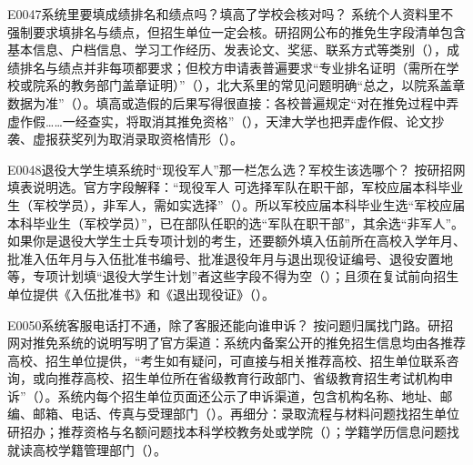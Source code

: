 \begin{qa}{E0047}{系统里要填成绩排名和绩点吗？填高了学校会核对吗？}
系统个人资料里不强制要求填排名与绩点，但招生单位一定会核。研招网公布的推免生字段清单包含基本信息、户档信息、学习工作经历、发表论文、奖惩、联系方式等类别（），成绩排名与绩点并非每项都要求；但校方申请表普遍要求“专业排名证明（需所在学校或院系的教务部门盖章证明）”（），北大系里的常见问题明确“总之，以院系盖章数据为准”（）。填高或造假的后果写得很直接：各校普遍规定“对在推免过程中弄虚作假……一经查实，将取消其推免资格”（），天津大学也把弄虚作假、论文抄袭、虚报获奖列为取消录取资格情形（）。
\end{qa}

\begin{qa}{E0048}{退役大学生填系统时“现役军人”那一栏怎么选？军校生该选哪个？}
按研招网填表说明选。官方字段解释：“现役军人 可选择军队在职干部，军校应届本科毕业生（军校学员），非军人，需如实选择”（）。所以军校应届本科毕业生选“军校应届本科毕业生（军校学员）”，已在部队任职的选“军队在职干部”，其余选“非军人”。如果你是退役大学生士兵专项计划的考生，还要额外填入伍前所在高校入学年月、批准入伍年月与入伍批准书编号、批准退役年月与退出现役证编号、退役安置地等，专项计划填“退役大学生计划”者这些字段不得为空（）；且须在复试前向招生单位提供《入伍批准书》和《退出现役证》（）。
\end{qa}

\begin{qa}{E0050}{系统客服电话打不通，除了客服还能向谁申诉？}
按问题归属找门路。研招网对推免系统的说明写明了官方渠道：系统内备案公开的推免招生信息均由各推荐高校、招生单位提供，“考生如有疑问，可直接与相关推荐高校、招生单位联系咨询，或向推荐高校、招生单位所在省级教育行政部门、省级教育招生考试机构申诉”（）。系统内每个招生单位页面还公示了申诉渠道，包含机构名称、地址、邮编、邮箱、电话、传真与受理部门（）。再细分：录取流程与材料问题找招生单位研招办；推荐资格与名额问题找本科学校教务处或学院（）；学籍学历信息问题找就读高校学籍管理部门（）。
\end{qa}

